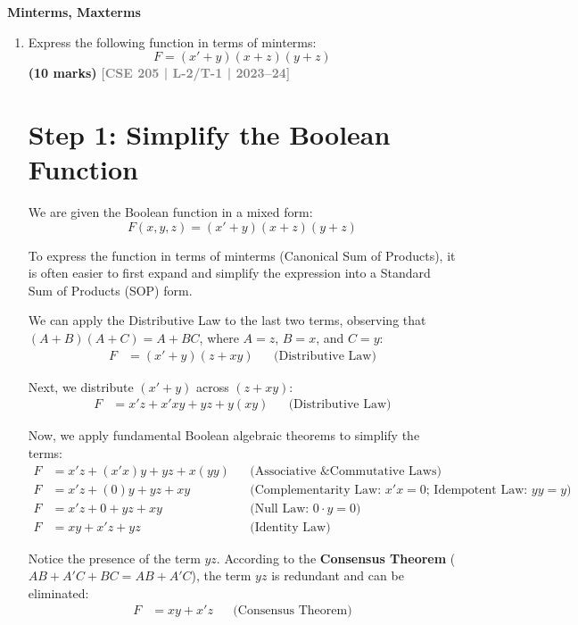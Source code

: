 \documentclass[12pt,a3paper]{article}
\newcommand{\yr}[1]{\hfill\textcolor{gray}{\small\textbf{[#1]}}}
\newcommand{\mk}[1]{\textcolor{orange!70!black}{\small\textbf{(#1 marks)}}}
\newcommand{\subtopic}[2]{%
  \vspace{10pt}
  \noindent\begin{tcolorbox}[colback=#1!8,colframe=#1,boxrule=0.6pt,arc=4pt,
    left=6pt,right=6pt,top=4pt,bottom=4pt]
    \small\bfseries\textcolor{#1}{#2}
  \end{tcolorbox}
  \vspace{2pt}
}
\begin{document}
\subtopic{cB}{Minterms, Maxterms}
\label{sub:s2-Min-Maxterms}
\begin{enumerate}
  

\item Express the following function in terms of minterms:
\[ F = (x'+y)(x+z)(y+z) \]
\mk{10} \yr{CSE 205 | L-2/T-1 | 2023--24}

\begin{tcolorbox}[enhanced,breakable,ansbox,colback=cB!4,colframe=cB,boxrule=0.8pt,arc=5pt,title={\textbf{Answer}},fonttitle=\bfseries\color{white},colbacktitle=cB]

\section*{Step 1: Simplify the Boolean Function}

We are given the Boolean function in a mixed form:
\begin{equation*}
    F(x, y, z) = (x' + y)(x + z)(y + z)
\end{equation*}

To express the function in terms of minterms (Canonical Sum of Products), it is often easier to first expand and simplify the expression into a Standard Sum of Products (SOP) form.

We can apply the Distributive Law to the last two terms, observing that $(A+B)(A+C) = A + BC$, where $A=z$, $B=x$, and $C=y$:
\begin{align*}
    F &= (x' + y)(z + xy) && \text{(Distributive Law)}
\end{align*}

Next, we distribute $(x' + y)$ across $(z + xy)$:
\begin{align*}
    F &= x'z + x'xy + yz + y(xy) && \text{(Distributive Law)}
\end{align*}

Now, we apply fundamental Boolean algebraic theorems to simplify the terms:
\begin{align*}
    F &= x'z + (x'x)y + yz + x(yy) && \text{(Associative \& Commutative Laws)} \\
    F &= x'z + (0)y + yz + xy && \text{(Complementarity Law: } x'x = 0 \text{; Idempotent Law: } yy = y \text{)} \\
    F &= x'z + 0 + yz + xy && \text{(Null Law: } 0 \cdot y = 0 \text{)} \\
    F &= xy + x'z + yz && \text{(Identity Law)}
\end{align*}

Notice the presence of the term $yz$. According to the \textbf{Consensus Theorem} ($AB + A'C + BC = AB + A'C$), the term $yz$ is redundant and can be eliminated:
\begin{align*}
    F &= xy + x'z && \text{(Consensus Theorem)}
\end{align*}


\end{tcolorbox}
\end{enumerate}
\end{document}
